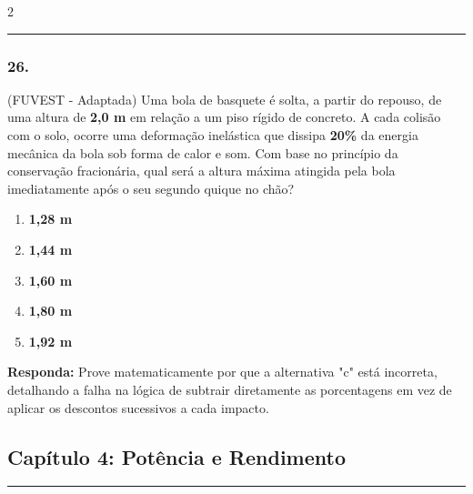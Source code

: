 \documentclass[twoside, 10pt, a4paper]{article}
\newlength{\espacoPosTitulo}\setlength{\espacoPosTitulo}{0.3cm}
\newlength{\espacoPreQuestao}\setlength{\espacoPreQuestao}{0.1cm}
\newlength{\espacoQuestao}\setlength{\espacoQuestao}{0.2cm}
\newlength{\espacoAlt}\setlength{\espacoAlt}{0.2cm}
\begin{document}
\begin{multicols*}{2}
\noindent\textcolor{CorLinha}{\rule{\linewidth}{0.5pt}} 
\par\vspace{\espacoPreQuestao}
\subsubsection*{26.} (FUVEST - Adaptada) Uma bola de basquete é solta, a partir do repouso, de uma altura de \textbf{2,0 m} em relação a um piso rígido de concreto. A cada colisão com o solo, ocorre uma deformação inelástica que dissipa \textbf{20\%} da energia mecânica da bola sob forma de calor e som. Com base no princípio da conservação fracionária, qual será a altura máxima atingida pela bola imediatamente após o seu segundo quique no chão?
\begin{enumerate}[label=\alph*), itemsep=\espacoAlt]
    \item \textbf{1,28 m}
    \item \textbf{1,44 m}
    \item \textbf{1,60 m}
    \item \textbf{1,80 m}
    \item \textbf{1,92 m}
\end{enumerate}
\begin{boxresponda}
\textbf{Responda:} Prove matematicamente por que a alternativa "c" está incorreta, detalhando a falha na lógica de subtrair diretamente as porcentagens em vez de aplicar os descontos sucessivos a cada impacto.
\end{boxresponda}
\par\vspace{\espacoQuestao}


\subsection*{Capítulo 4: Potência e Rendimento}
\vspace{-0.2cm}\noindent\rule{\linewidth}{1.5pt} 
\par\vspace{\espacoPosTitulo}

\end{multicols*}
\end{document}

